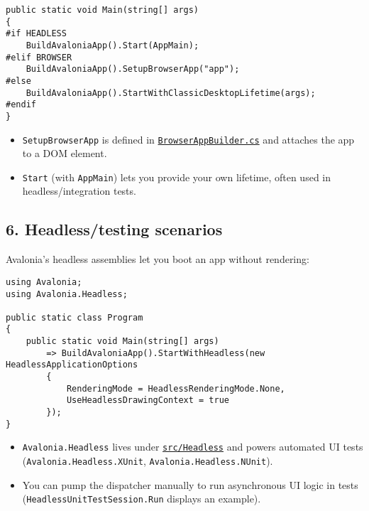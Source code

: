 \begin{lstlisting}
public static void Main(string[] args)
{
#if HEADLESS
    BuildAvaloniaApp().Start(AppMain);
#elif BROWSER
    BuildAvaloniaApp().SetupBrowserApp("app");
#else
    BuildAvaloniaApp().StartWithClassicDesktopLifetime(args);
#endif
}
\end{lstlisting}

\begin{itemize}
\tightlist
\item
  \passthrough{\lstinline!SetupBrowserApp!} is defined in
  \href{https://github.com/AvaloniaUI/Avalonia/blob/master/src/Browser/Avalonia.Browser/BrowserAppBuilder.cs}{\passthrough{\lstinline!BrowserAppBuilder.cs!}}
  and attaches the app to a DOM element.
\item
  \passthrough{\lstinline!Start!} (with
  \passthrough{\lstinline!AppMain!}) lets you provide your own lifetime,
  often used in headless/integration tests.
\end{itemize}

\subsection{6. Headless/testing
scenarios}\label{headlesstesting-scenarios}

Avalonia's headless assemblies let you boot an app without rendering:

\begin{lstlisting}
using Avalonia;
using Avalonia.Headless;

public static class Program
{
    public static void Main(string[] args)
        => BuildAvaloniaApp().StartWithHeadless(new HeadlessApplicationOptions
        {
            RenderingMode = HeadlessRenderingMode.None,
            UseHeadlessDrawingContext = true
        });
}
\end{lstlisting}

\begin{itemize}
\tightlist
\item
  \passthrough{\lstinline!Avalonia.Headless!} lives under
  \href{https://github.com/AvaloniaUI/Avalonia/tree/master/src/Headless}{\passthrough{\lstinline!src/Headless!}}
  and powers automated UI tests
  (\passthrough{\lstinline!Avalonia.Headless.XUnit!},
  \passthrough{\lstinline!Avalonia.Headless.NUnit!}).
\item
  You can pump the dispatcher manually to run asynchronous UI logic in
  tests (\passthrough{\lstinline!HeadlessUnitTestSession.Run!} displays
  an example).
\end{itemize}


